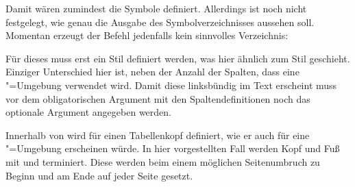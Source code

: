 \documentclass[%
  english,ngerman,%
  geometry=no,DIV=12,automark,%
]{tudscrartcl}
\begin{document}
%
Damit wären zumindest die Symbole definiert. Allerdings ist noch nicht 
festgelegt, wie genau die Ausgabe des Symbolverzeichnisses aussehen soll. 
Momentan erzeugt der Befehl  jedenfalls kein sinnvolles 
Verzeichnis:
%
\begin{Hint*}
\printsymbols
\end{Hint*}
\begin{quoting}[rightmargin=0pt]
\vspace*{-\baselineskip}
\glsdisablehyper
\printsymbols
\end{quoting}
%
Für dieses muss erst ein Stil definiert werden, was hier ähnlich zum Stil 
 geschieht. Einziger Unterschied hier ist, neben der 
Anzahl der Spalten, dass eine "=Umgebung verwendet wird. 
Damit diese linksbündig im Text erscheint muss vor dem obligatorischen Argument 
mit den Spaltendefinitionen noch das optionale Argument  angegeben 
werden.
%
\InputHook{\let\newglossarystyle\renewglossarystyle}
\begin{Excerpt}
\end{Excerpt}
%
Innerhalb von  wird  für einen
Tabellenkopf definiert, wie er auch für eine "=Umgebung 
erscheinen würde. In hier vorgestellten Fall werden Kopf und Fuß mit 
 und  terminiert. Diese werden beim einem 
möglichen Seitenumbruch zu Beginn und am Ende auf jeder Seite gesetzt.
\end{document}
